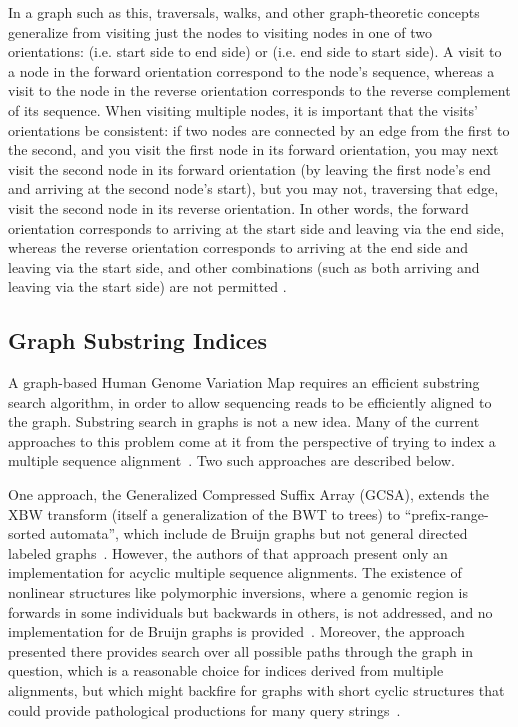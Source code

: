In a graph such as this, traversals, walks, and other graph-theoretic concepts generalize from visiting just the nodes to visiting nodes in one of two orientations:  (i.e. start side to end side) or  (i.e. end side to start side). A visit to a node in the forward orientation correspond to the node's sequence, whereas a visit to the node in the reverse orientation corresponds to the reverse complement of its sequence. When visiting multiple nodes, it is important that the visits' orientations be consistent: if two nodes are connected by an edge from the first to the second, and you visit the first node in its forward orientation, you may next visit the second node in its forward orientation (by leaving the first node's end and arriving at the second node's start), but you may not, traversing that edge, visit the second node in its reverse orientation. In other words, the forward orientation corresponds to arriving at the start side and leaving via the end side, whereas the reverse orientation corresponds to arriving at the end side and leaving via the start side, and other combinations (such as both arriving and leaving via the start side) are not permitted \cite{bodily2016scaffoldscaffolder}.


\subsection{Graph Substring Indices}

A graph-based Human Genome Variation Map requires an efficient substring search algorithm, in order to allow sequencing reads to be efficiently aligned to the graph. Substring search in graphs is not a new idea. Many of the current approaches to this problem come at it from the perspective of trying to index a multiple sequence alignment~\cite{siren2014indexing}. Two such approaches are described below.

One approach, the Generalized Compressed Suffix Array (GCSA), extends the XBW transform (itself a generalization of the BWT to trees) to ``prefix-range-sorted automata'', which include de Bruijn graphs but not general directed labeled graphs~\cite{siren2014indexing}. However, the authors of that approach present only an implementation for acyclic multiple sequence alignments. The existence of nonlinear structures like polymorphic inversions, where a genomic region is forwards in some individuals but backwards in others, is not addressed, and no implementation for de Bruijn graphs is provided~\cite{siren2014indexing}. Moreover, the approach presented there provides search over all possible paths through the graph in question, which is a reasonable choice for indices derived from multiple alignments, but which might backfire for graphs with short cyclic structures that could provide pathological productions for many query strings~\cite{siren2014indexing}.

